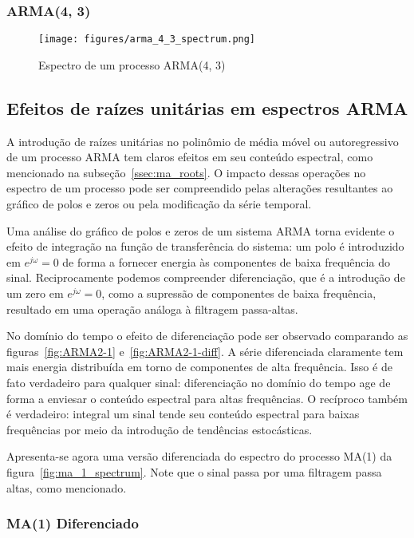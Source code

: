 \subsubsection{ARMA(4, 3)}

\begin{figure}[H]
    \centering
    \texttt{[image: figures/arma\_4\_3\_spectrum.png]}
    \caption{Espectro de um processo ARMA(4, 3)}
    \label{fig:ar_4_3_spectrum}
\end{figure}


\subsection{Efeitos de raízes unitárias em espectros ARMA}

A introdução de raízes unitárias no polinômio de média móvel ou autoregressivo
de um processo ARMA tem claros efeitos em seu conteúdo espectral, como
mencionado na subseção~\ref{ssec:ma_roots}. O impacto dessas operações no
espectro de um processo pode ser compreendido pelas alterações resultantes ao
gráfico de polos e zeros ou pela modificação da série temporal.

Uma análise do gráfico de polos e zeros de um sistema ARMA torna evidente o
efeito de integração na função de transferência do sistema: um polo é
introduzido em $e^{j\omega}=0$ de forma a fornecer energia às componentes de
baixa frequência do sinal. Reciprocamente podemos compreender diferenciação,
que é a introdução de um zero em $e^{j\omega}=0$, como a supressão de
componentes de baixa frequência, resultado em uma operação análoga à filtragem
passa-altas.

No domínio do tempo o efeito de diferenciação pode ser observado comparando as
figuras~\ref{fig:ARMA2-1} e~\ref{fig:ARMA2-1-diff}. A série diferenciada
claramente tem mais energia distribuída em torno de componentes de alta
frequência. Isso é de fato verdadeiro para qualquer sinal: diferenciação
no domínio do tempo age de forma a enviesar o conteúdo espectral para altas
frequências. O recíproco também é verdadeiro: integral um sinal tende seu
conteúdo espectral para baixas frequências por meio da introdução de tendências
estocásticas.

Apresenta-se agora uma versão diferenciada do espectro do processo MA(1) da
figura~\ref{fig:ma_1_spectrum}. Note que o sinal passa por uma filtragem
passa altas, como mencionado.

\subsubsection{MA(1) Diferenciado}

